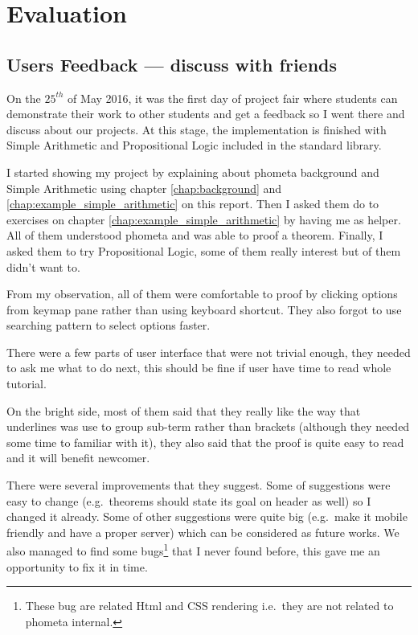 \documentclass[master.tex]{subfiles}
\begin{document}
\chapter{Evaluation}

\section{Users Feedback --- discuss with friends}

On the $25^{th}$ of May 2016, it was the first day of project fair where
students can demonstrate their work to other students and get a feedback so I
went there and discuss about our projects. At this stage, the implementation is
finished with Simple Arithmetic and Propositional Logic included in the standard library.

I started showing my project by explaining about phometa background and Simple
Arithmetic using chapter \ref{chap:background} and
\ref{chap:example_simple_arithmetic} on this report. Then I asked them do to
exercises on chapter \ref{chap:example_simple_arithmetic} by having me as
helper. All of them understood phometa and was able to proof a theorem. Finally,
I asked them to try Propositional Logic, some of them really interest but of
them didn't want to.

From my observation, all of them were comfortable to proof by clicking options
from keymap pane rather than using keyboard shortcut. They also forgot to use
searching pattern to select options faster.

There were a few parts of user interface that were not trivial enough, they
needed to ask me what to do next, this should be fine if user have time to read
whole tutorial.

On the bright side, most of them said that they really like the way that
underlines was use to group sub-term rather than brackets (although they needed
some time to familiar with it), they also said that the proof is quite easy to
read and it will benefit newcomer.

There were several improvements that they suggest. Some of suggestions
were easy to change (e.g.\ theorems should state its goal on header as well) so
I changed it already. Some of other suggestions were quite big (e.g.\ make it
mobile friendly and have a proper server) which can be considered as future
works. We also managed to find some bugs\footnote{These bug are
  related Html and CSS rendering i.e.\ they are not related to phometa internal.} that I never found before,
this gave me an opportunity to fix it in time.
\end{document}

